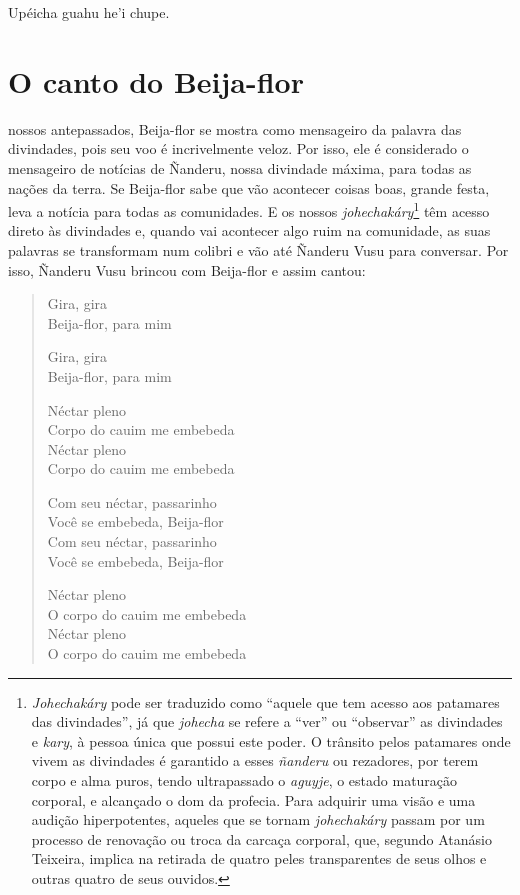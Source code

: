 Upéicha guahu he'i chupe.

\chapter{O canto do Beija-flor}

 nossos antepassados, Beija-flor se mostra como mensageiro da
palavra das divindades, pois seu voo é incrivelmente veloz. Por isso,
ele é considerado o mensageiro de notícias de Ñanderu, nossa divindade
máxima, para todas as nações da terra. Se Beija-flor sabe que vão
acontecer coisas boas, grande festa, leva a notícia para todas as
comunidades. E os nossos \textit{johechakáry}\footnote{\textit{Johechakáry}
  pode ser traduzido como ``aquele que tem acesso aos patamares das
  divindades'', já que \textit{johecha} se refere a ``ver'' ou
  ``observar'' as divindades e \textit{kary}, à pessoa única que possui
  este poder. O trânsito pelos patamares onde vivem as divindades é
  garantido a esses \textit{ñanderu} ou rezadores, por terem corpo e alma
  puros, tendo ultrapassado o \textit{aguyje}, o estado maturação
  corporal, e alcançado o dom da profecia. Para adquirir uma visão e uma
  audição hiperpotentes, aqueles que se tornam \textit{johechakáry} passam
  por um processo de renovação ou troca da carcaça corporal, que,
  segundo Atanásio Teixeira, implica na retirada de quatro peles
  transparentes de seus olhos e outras quatro de seus ouvidos.} têm
acesso direto às divindades e, quando vai acontecer algo ruim na
comunidade, as suas palavras se transformam num colibri e vão até
Ñanderu Vusu para conversar. Por isso, Ñanderu Vusu brincou com
Beija-flor e assim cantou:

\begin{verse}
Gira, gira\\
Beija-flor, para mim

Gira, gira\\
Beija-flor, para mim

Néctar pleno\\
Corpo\footnotemark{} do cauim me embebeda\footnotemark{}\\
Néctar pleno\\
Corpo do cauim me embebeda

Com seu néctar, passarinho\\
Você se embebeda, Beija-flor\\
Com seu néctar, passarinho\\
Você se embebeda, Beija-flor

Néctar pleno\\
O corpo do cauim me embebeda\\
Néctar pleno\\
O corpo do cauim me embebeda
\end{verse}

